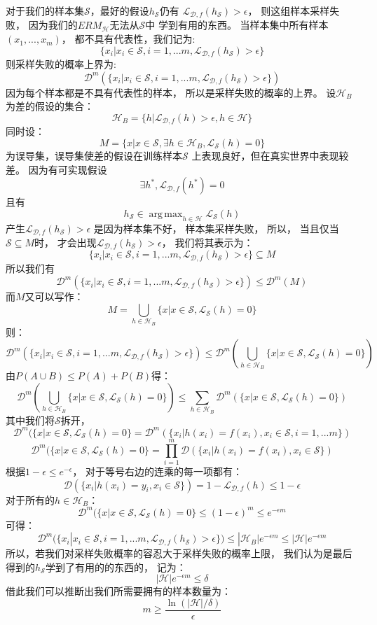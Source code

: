 \documentclass[UTF8]{ctexart}
\DeclareMathOperator*{\argmax}{arg\,max}
\begin{document}
对于我们的样本集$\mathcal{S}$，最好的假设$h_{\mathcal{S}}$仍有
$\mathcal{L}_{\mathcal{D},f}(h_{\mathcal{S}})>\epsilon$，
则这组样本采样失败，
因为我们的${ERM}_{\mathcal{H}}$无法从$\mathcal{S}$中
学到有用的东西。
当样本集中所有样本$(x_1,...,x_m)$，
都不具有代表性，我们记为:
$$
\{x_i|x_i\in\mathcal{S},i=1,...m,
\mathcal{L}_{\mathcal{D},f}(h_{\mathcal{S}})>\epsilon
\}
$$
则采样失败的概率上界为:
$$
\mathcal{D}^m
(
\{x_i|x_i\in\mathcal{S},i=1,...m,
\mathcal{L}_{\mathcal{D},f}(h_{\mathcal{S}})>\epsilon
\}
)
$$
因为每个样本都是不具有代表性的样本，
所以是采样失败的概率的上界。
设$\mathcal{H}_B$为差的假设的集合：
$$
\mathcal{H}_B=
\{
h|\mathcal{L}_{\mathcal{D},f}(h)>\epsilon,
h\in\mathcal{H}
\}
$$
同时设：
$$
M=\{x|x\in\mathcal{S},
\exists h \in \mathcal{H}_B,
\mathcal{L}_{\mathcal{S}}(h)=0
\}
$$
为误导集，误导集使差的假设在训练样本$\mathcal{S}$
上表现良好，但在真实世界中表现较差。
因为有可实现假设
$$
\exists h^*,\mathcal{L}_{\mathcal{D},f}(h^*)=0
$$
且有
$$
h_{\mathcal{S}}\in 
\argmax_{h\in\mathcal{H}}
\mathcal{L}_{\mathcal{S}}(h)
$$
产生$\mathcal{L}_{\mathcal{D},f}(h_{\mathcal{S}})>\epsilon$
是因为样本集不好，
样本集采样失败，
所以，
当且仅当$\mathcal{S}\subseteq M$时，
才会出现$\mathcal{L}_{\mathcal{D},f}(h_{\mathcal{S}})>\epsilon$，
我们将其表示为：
$$
\{x_i|x_i\in\mathcal{S},i=1,...m,
\mathcal{L}_{\mathcal{D},f}(h_{\mathcal{S}})>\epsilon
\}\subseteq M
$$
所以我们有
$$
\mathcal{D}^m
(\{x_i|x_i\in\mathcal{S},i=1,...m,
\mathcal{L}_{\mathcal{D},f}(h_{\mathcal{S}})>\epsilon
\})
\leq \mathcal{D}^m(M)
$$
而$M$又可以写作：
$$
M=\bigcup_{h\in\mathcal{H}_B}
\{
x|x\in \mathcal{S},
\mathcal{L}_{\mathcal{S}}(h)=0
\}
$$
则：
$$
\mathcal{D}^m
(\{x_i|x_i\in\mathcal{S},i=1,...m,
\mathcal{L}_{\mathcal{D},f}(h_{\mathcal{S}})>\epsilon
\})
\leq \mathcal{D}^m(\bigcup_{h\in\mathcal{H}_B}
\{
x|x\in \mathcal{S},
\mathcal{L}_{\mathcal{S}}(h)=0
\})
$$
由$P(A\cup B)\leq P(A)+P(B)$得：
$$
\mathcal{D}^m(\bigcup_{h\in\mathcal{H}_B}
\{
x|x\in \mathcal{S},
\mathcal{L}_{\mathcal{S}}(h)=0
\})
\leq
\sum_{h\in\mathcal{H}_B}
\mathcal{D}^m(\{
x|x\in \mathcal{S},
\mathcal{L}_{\mathcal{S}}(h)=0
\})
$$
其中我们将$\mathcal{S}$拆开，
$$
\mathcal{D}^m(\{
x|x\in \mathcal{S},
\mathcal{L}_{\mathcal{S}}(h)=0
\}
=\mathcal{D}^m(\{
x_i|h(x_i)=f(x_i),
x_i\in \mathcal{S},
i=1,...m
\})
$$
$$
\mathcal{D}^m(\{
x|x\in \mathcal{S},
\mathcal{L}_{\mathcal{S}}(h)=0
\}
=\prod^m_{i=1}\mathcal{D}(\{
x_i|h(x_i)=f(x_i),
x_i\in\mathcal{S}
\})
$$
根据$1-\epsilon\leq e^{-\epsilon}$，
对于等号右边的连乘的每一项都有：
$$
\mathcal{D}(\{
x_i|h(x_i)=y_i,
x_i\in\mathcal{S}
\})
=1-\mathcal{L}_{\mathcal{D},f}(h)
\leq 1-\epsilon
$$
对于所有的$h\in\mathcal{H}_B$：
$$
\mathcal{D}^m(\{
x|x\in \mathcal{S},
\mathcal{L}_{\mathcal{S}}(h)=0
\}
\leq (1-\epsilon)^m
\leq e^{-\epsilon m}
$$
可得：
$$
\mathcal{D}^m
(\{x_i|x_i\in\mathcal{S},i=1,...m,
\mathcal{L}_{\mathcal{D},f}(h_{\mathcal{S}})>\epsilon
\})
\leq |\mathcal{H}_B|e^{-\epsilon m}
\leq |\mathcal{H}|e^{-\epsilon m}
$$
所以，若我们对采样失败概率的容忍大于采样失败的概率上限，
我们认为是最后得到的$h_{\mathcal{S}}$学到了有用的的东西的，
记为：
$$
|\mathcal{H}|e^{-\epsilon m}
\leq \delta
$$
借此我们可以推断出我们所需要拥有的样本数量为：
$$
m \geq \frac{\ln(|\mathcal{H}|/\delta)}{\epsilon}
$$
\end{document}
